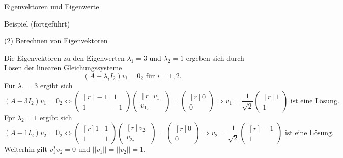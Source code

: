 \documentclass[
  8pt,
  ignorenonframetext,
]{beamer}
\begin{document}
\begin{frame}{Eigenvektoren und Eigenwerte}
\protect\hypertarget{eigenvektoren-und-eigenwerte-6}{}

Beispiel (fortgeführt)

\small

\noindent (2) Berechnen von Eigenvektoren

\footnotesize

Die Eigenvektoren zu den Eigenwerten \(\lambda_1 = 3\) und
\(\lambda_2 = 1\) ergeben sich durch Lösen der linearen
Gleichungssysteme \begin{equation}
(A - \lambda_i I_2)v_i = 0_2 \mbox{ für } i = 1,2.
\end{equation} Für \(\lambda_1 = 3\) ergibt sich \begin{equation}
(A - 3I_2)v_1 = 0_2
\Leftrightarrow
\begin{pmatrix*}[r]
-1 & 1 \\
 1 & -1
\end{pmatrix*}
\begin{pmatrix*}[r]
v_{1_1} \\
v_{1_2}
\end{pmatrix*}
=
\begin{pmatrix*}[r]
0 \\
0
\end{pmatrix*}
\Rightarrow
v_1 =
\frac{1}{\sqrt{2}}
\begin{pmatrix*}[r]
1 \\
1
\end{pmatrix*}
\mbox{ ist eine Lösung. }
\end{equation} Fpr \(\lambda_2 = 1\) ergibt sich \begin{equation}
(A - 1I_2)v_2 = 0_2
\Leftrightarrow
\begin{pmatrix*}[r]
1 & 1 \\
1 & 1
\end{pmatrix*}
\begin{pmatrix*}[r]
v_{2_1} \\
v_{2_2}
\end{pmatrix*}
=
\begin{pmatrix*}[r]
0 \\
0
\end{pmatrix*}
\Rightarrow
v_2 =
\frac{1}{\sqrt{2}}
\begin{pmatrix*}[r]
-1 \\
 1
\end{pmatrix*}
\mbox{ ist eine Lösung. }
\end{equation} Weiterhin gilt \(v_1^Tv_2 = 0\) und
\(||v_1|| = ||v_2|| = 1\).
\end{frame}
\end{document}
